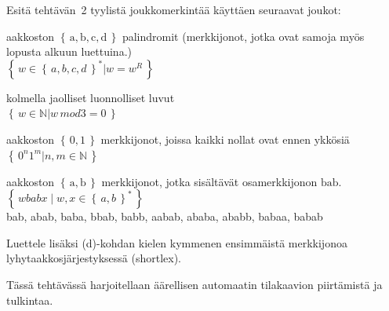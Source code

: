 \documentclass[12pt,a4paper]{article}
\newcommand{\set}[1]{\left\{\,#1\,\right\}}
\newcommand{\N}{\mathbb{N}}
\newcommand{\rma}{\mathrm{a}}
\newcommand{\rmb}{\mathrm{b}}
\begin{document}
\pagebreak
{}
Esitä tehtävän~2 tyylistä joukkomerkintää
käyttäen seuraavat joukot:
\begin{kohta}
\item
aakkoston $\set{\mathrm{a},\mathrm{b},\mathrm{c},\mathrm{d}}$
palindromit
(merkkijonot, jotka ovat samoja myös lopusta alkuun luettuina.)\\

$\set{w \in \set{a,b,c,d}^* | w = w^R } $
\item
kolmella jaolliset luonnolliset luvut\\

$\set{w \in \mathbb{N} | w\, mod 3 = 0 } $
\item
aakkoston $\set{0,1}$ merkkijonot, joissa kaikki nollat ovat
ennen ykkösiä\\

$\set{{0^n 1^m}|n, m \in \N } $
\item
aakkoston $\set{\rma,\rmb}$ merkkijonot, jotka sisältävät
osamerkkijonon $\mathrm{bab}$.\\

$\set{wbabx \mid w, x \in \set{a, b}^*  } $\\

bab, abab, baba, bbab, babb, aabab, ababa, ababb, babaa, babab


\end{kohta}
Luettele lisäksi (d)-kohdan kielen kymmenen ensimmäistä
merkkijonoa lyhytaakkosjärjestyksessä (shortlex).




\pagebreak
{}
Tässä tehtävässä harjoitellaan äärellisen automaatin tilakaavion piirtämistä ja tulkintaa.\\
\end{document}
